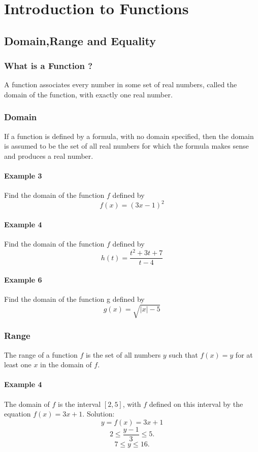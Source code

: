 \chapter{Introduction to Functions}
\author{Nithin}

\section{Domain,Range and Equality}

\subsection{What is a Function ?}
A function associates every number in some set of real numbers, called the domain of the function, with exactly one real number.

\subsection{Domain}
If a function is defined by a formula, with no domain specified, then the domain is assumed to be the set of all real numbers for which the formula makes sense and produces a real number.

\subsubsection{Example 3}
Find the domain of the function \(f\)  defined by \[f (x) = (3x-1)^2 \]

\subsubsection{Example 4}
Find the domain of the function \(f\) defined by \[h (t) = \frac{t^2 + 3t + 7}{t-4} \]

\subsubsection{Example 6}
Find the domain of the function g defined by \[g(x) = \sqrt{|x|-5}\]

\subsection{Range}
The range of a function \(f\) is the set of all numbers \(y\) such that \(f (x) = y\) for at least one \(x\) in the domain of \(f\).

\subsubsection{Example 4}
The domain of \(f\) is the interval \( [2, 5] \), with \(f\) defined on this interval by the equation \(f (x) = 3x + 1\).
Solution:
\[ y = f(x) = 3x+1 \]
\[ 2 \leq \frac{y-1}{3} \leq 5. \]
\[ 7 \leq y \leq 16. \]

